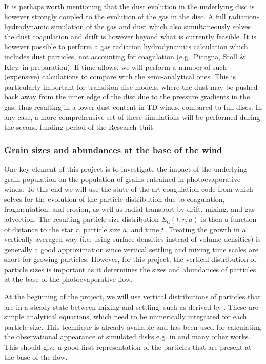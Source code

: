 \documentclass[10pt,fleqn,twoside]{article}
\begin{document}
It is perhaps worth mentioning that the dust evolution in the
underlying disc is however strongly coupled to the evolution of the gas
in the disc. A full radiation-hydrodynamic simulation of the gas and
dust which also simultaneously solves the dust coagulation and drift
is however beyond what is currently feasible. It is however possible
to perform a gas radiation hydrodynamics calculation which includes
dust particles, not accounting for coagulation (e.g.\ Picogna, Stoll \&
Kley,
in preparation). If time allows, we will perform a number of such
(expensive) calculations to compare with the semi-analytical
ones. This is particularly important for transition disc models, where
the dust may be pushed back away from the inner edge of the disc due
to the pressure gradients in the gas, thus resulting in a  lower dust
content in TD winds, compared to full discs.  In any case, a more
comprehensive set of these simulations will be performed during the
second funding period of the Research Unit.  

\subsubsection{Grain sizes and abundances at the base of the wind}

One key element of this project is to investigate the impact of the
underlying grain population on the population of grains entrained in
photoevaporative
winds. To this end we will use the state of the art coagulation code
from \citet{2010A&A...513A..79B} which solves for the evolution of the
particle distribution due to coagulation, fragmentation, and erosion,
as well as radial transport by drift, mixing, and gas advection. The
resulting particle size distribution $\Sigma_\mathrm{d}(t,r,a)$ is
then a function of distance to the star $r$, particle size $a$, and
time $t$. Treating the growth in a vertically averaged way (i.e.
using surface densities instead of volume densities) is generally a
good approximation since vertical settling and mixing time scales are
short for growing particles. However, for this project, the vertical
distribution of particle sizes is important as it determines the sizes
and abundances of particles at the base of the photoevaporative flow.

At the beginning of the project, we will use vertical distributions of
particles that are in a steady state between mixing and settling, such
as derived by \citet{2009A&A...496..597F}. These are simple analytical
equations, which need to be numerically integrated for each particle
size. This technique is already available and has been used for
calculating the observational appearance of simulated disks e.g.
in \citet{2015ApJ...813L..14B} and many other works. This should give
a good first representation of the particles that are present at the
base of the flow.
\end{document}
